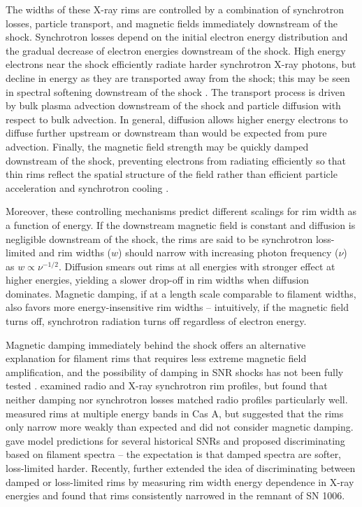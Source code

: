 \documentclass[iop, apj, numberedappendix]{emulateapj}
\begin{document}
The widths of these X-ray rims are controlled by a combination of
synchrotron losses, particle transport, and magnetic fields immediately
downstream of the shock.  Synchrotron losses depend on the initial electron
energy distribution and the gradual decrease of electron energies downstream of
the shock.  High energy electrons near the shock efficiently radiate harder
synchrotron X-ray photons, but decline in energy as they are transported away
from the shock; this may be seen in spectral softening downstream of the shock
\citep[e.g.,][]{cassam-chenai2007}.  The transport process is driven by bulk
plasma advection downstream of the shock and particle diffusion with respect to
bulk advection.  In general, diffusion allows higher energy electrons to
diffuse further upstream or downstream than would be expected from pure
advection.  Finally, the magnetic field strength may be quickly damped
downstream of the shock, preventing electrons from radiating efficiently so
that thin rims reflect the spatial structure of the field rather than efficient
particle acceleration and synchrotron cooling \citep{pohl2005}.

Moreover, these controlling mechanisms predict different scalings for rim width
as a function of energy.  If the downstream magnetic field is constant and
diffusion is negligible downstream of the shock, the rims are said to be
synchrotron loss-limited and rim widths ($w$) should narrow with increasing
photon frequency ($\nu$) as $w \propto \nu^{-1/2}$. Diffusion smears out rims
at all energies with stronger effect at higher energies, yielding a slower
drop-off in rim widths when diffusion dominates.  Magnetic damping, if at a
length scale comparable to filament widths, also favors more energy-insensitive
rim widths -- intuitively, if the magnetic field turns off, synchrotron
radiation turns off regardless of electron energy.

Magnetic damping immediately behind the shock offers an alternative explanation
for filament rims that requires less extreme magnetic field amplification, and
the possibility of damping in SNR shocks has not been fully tested
\citep{pohl2005, marcowith2010}.  \citet{cassam-chenai2007} examined radio and
X-ray synchrotron rim profiles, but found that neither damping nor synchrotron
losses matched radio profiles particularly well.  \citet{araya2010} measured
rims at multiple energy bands in Cas A, but suggested that the rims only narrow
more weakly than expected and did not consider magnetic damping.
\citet{rettig2012} gave model predictions for several historical SNRs and
proposed discriminating based on filament spectra -- the expectation is that
damped spectra are softer, loss-limited harder.  Recently, \citet{ressler2014}
further extended the idea of discriminating between damped or loss-limited rims
by measuring rim width energy dependence in X-ray energies and found that rims
consistently narrowed in the remnant of SN 1006.
\end{document}
